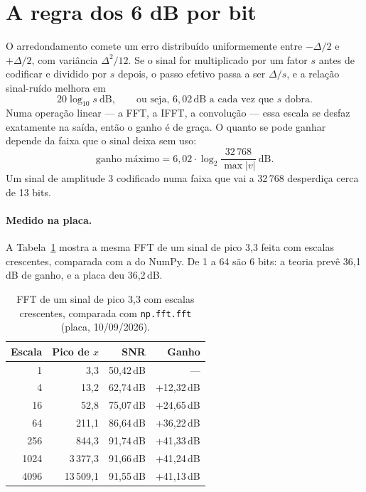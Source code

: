 \section{A regra dos 6 dB por bit}

O arredondamento comete um erro distribuído uniformemente entre
\(-\Delta/2\) e \(+\Delta/2\), com variância \(\Delta^2/12\). Se o sinal for
multiplicado por um fator \(s\) antes de codificar e dividido por \(s\) depois,
o passo efetivo passa a ser \(\Delta/s\), e a relação sinal-ruído melhora em
\[
  20 \log_{10} s \ \text{dB}, \qquad
  \text{ou seja, } 6{,}02\,\text{dB a cada vez que } s \text{ dobra.}
\]
Numa operação linear --- a FFT, a IFFT, a convolução --- essa escala se desfaz
exatamente na saída, então o ganho é de graça. O quanto se pode ganhar depende
da faixa que o sinal deixa sem uso:
\[
  \text{ganho máximo} = 6{,}02 \cdot \log_2 \frac{32\,768}{\max |v|}\ \text{dB}.
\]
Um sinal de amplitude 3 codificado numa faixa que vai a 32\,768 desperdiça
cerca de 13 bits.

\paragraph{Medido na placa.} A Tabela~\ref{tab:escala} mostra a mesma FFT de um
sinal de pico 3,3 feita com escalas crescentes, comparada com a do NumPy. De 1
a 64 são 6 bits: a teoria prevê 36,1\,dB de ganho, e a placa deu 36,2\,dB.

\begin{table}[htbp]
  \centering
  \small
  \caption{FFT de um sinal de pico 3,3 com escalas crescentes, comparada com
    \texttt{np.fft.fft} (placa, 10/09/2026).}
  \label{tab:escala}
  \begin{tabular}{@{}rrrr@{}}
    \toprule
    \textbf{Escala} & \textbf{Pico de} \(x\) & \textbf{SNR} & \textbf{Ganho} \\
    \midrule
    1     & 3,3       & 50,42\,dB & ---       \\
    4     & 13,2      & 62,74\,dB & +12,32\,dB \\
    16    & 52,8      & 75,07\,dB & +24,65\,dB \\
    64    & 211,1     & 86,64\,dB & +36,22\,dB \\
    256   & 844,3     & 91,74\,dB & +41,33\,dB \\
    1024  & 3\,377,3  & 91,66\,dB & +41,24\,dB \\
    4096  & 13\,509,1 & 91,55\,dB & +41,13\,dB \\
    \bottomrule
  \end{tabular}
\end{table}

